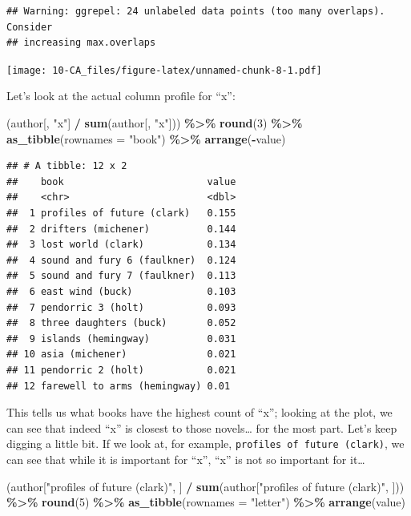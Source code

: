 \documentclass[
]{book}
\newenvironment{Shaded}{\begin{snugshade}}{\end{snugshade}}
\newcommand{\AttributeTok}[1]{\textcolor[rgb]{0.13,0.29,0.53}{#1}}
\newcommand{\DecValTok}[1]{\textcolor[rgb]{0.00,0.00,0.81}{#1}}
\newcommand{\FunctionTok}[1]{\textcolor[rgb]{0.13,0.29,0.53}{\textbf{#1}}}
\newcommand{\NormalTok}[1]{#1}
\newcommand{\SpecialCharTok}[1]{\textcolor[rgb]{0.81,0.36,0.00}{\textbf{#1}}}
\newcommand{\StringTok}[1]{\textcolor[rgb]{0.31,0.60,0.02}{#1}}
\begin{document}
\begin{verbatim}
## Warning: ggrepel: 24 unlabeled data points (too many overlaps). Consider
## increasing max.overlaps
\end{verbatim}

\texttt{[image: 10-CA\_files/figure-latex/unnamed-chunk-8-1.pdf]}

Let's look at the actual column profile for ``x'':

\begin{Shaded}
\begin{Highlighting}[]
\NormalTok{(author[, }\StringTok{"x"}\NormalTok{] }\SpecialCharTok{/} \FunctionTok{sum}\NormalTok{(author[, }\StringTok{"x"}\NormalTok{])) }\SpecialCharTok{\%\textgreater{}\%}
  \FunctionTok{round}\NormalTok{(}\DecValTok{3}\NormalTok{) }\SpecialCharTok{\%\textgreater{}\%}
  \FunctionTok{as\_tibble}\NormalTok{(}\AttributeTok{rownames =} \StringTok{"book"}\NormalTok{) }\SpecialCharTok{\%\textgreater{}\%}
  \FunctionTok{arrange}\NormalTok{(}\SpecialCharTok{{-}}\NormalTok{value)}
\end{Highlighting}
\end{Shaded}

\begin{verbatim}
## # A tibble: 12 x 2
##    book                         value
##    <chr>                        <dbl>
##  1 profiles of future (clark)   0.155
##  2 drifters (michener)          0.144
##  3 lost world (clark)           0.134
##  4 sound and fury 6 (faulkner)  0.124
##  5 sound and fury 7 (faulkner)  0.113
##  6 east wind (buck)             0.103
##  7 pendorric 3 (holt)           0.093
##  8 three daughters (buck)       0.052
##  9 islands (hemingway)          0.031
## 10 asia (michener)              0.021
## 11 pendorric 2 (holt)           0.021
## 12 farewell to arms (hemingway) 0.01
\end{verbatim}

This tells us what books have the highest count of ``x''; looking at the plot, we can see that indeed ``x'' is closest to those novels\ldots{} for the most part. Let's keep digging a little bit. If we look at, for example, \texttt{profiles\ of\ future\ (clark)}, we can see that while it is important for ``x'', ``x'' is not so important for it\ldots{}

\begin{Shaded}
\begin{Highlighting}[]
\NormalTok{(author[}\StringTok{"profiles of future (clark)"}\NormalTok{, ] }\SpecialCharTok{/} \FunctionTok{sum}\NormalTok{(author[}\StringTok{"profiles of future (clark)"}\NormalTok{, ])) }\SpecialCharTok{\%\textgreater{}\%}
  \FunctionTok{round}\NormalTok{(}\DecValTok{5}\NormalTok{) }\SpecialCharTok{\%\textgreater{}\%}
  \FunctionTok{as\_tibble}\NormalTok{(}\AttributeTok{rownames =} \StringTok{"letter"}\NormalTok{) }\SpecialCharTok{\%\textgreater{}\%}
  \FunctionTok{arrange}\NormalTok{(value)}
\end{Highlighting}
\end{Shaded}
\end{document}
